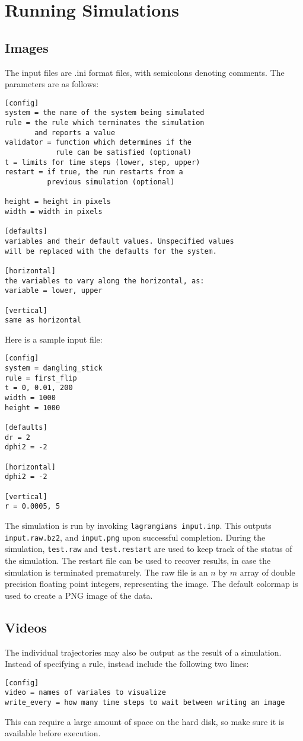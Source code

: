 \documentclass{article}
\begin{document}
\section{Running Simulations}
\subsection{Images}
The input files are .ini format files, with semicolons denoting comments. The parameters are as follows:
\begin{verbatim}
[config]
system = the name of the system being simulated
rule = the rule which terminates the simulation
       and reports a value
validator = function which determines if the
            rule can be satisfied (optional)
t = limits for time steps (lower, step, upper)
restart = if true, the run restarts from a 
          previous simulation (optional)

height = height in pixels
width = width in pixels

[defaults]
variables and their default values. Unspecified values
will be replaced with the defaults for the system.

[horizontal]
the variables to vary along the horizontal, as:
variable = lower, upper

[vertical]
same as horizontal
\end{verbatim}
Here is a sample input file:
\begin{verbatim}
[config]
system = dangling_stick
rule = first_flip
t = 0, 0.01, 200
width = 1000
height = 1000

[defaults]
dr = 2
dphi2 = -2

[horizontal]
dphi2 = -2

[vertical]
r = 0.0005, 5
\end{verbatim}

The simulation is run by invoking \texttt{lagrangians input.inp}. This outputs \texttt{input.raw.bz2}, and \texttt{input.png} upon successful completion. During the simulation, \texttt{test.raw} and \texttt{test.restart} are used to keep track of the status of the simulation. The restart file can be used to recover results, in case the simulation is terminated prematurely. The raw file is an $n$ by $m$ array of double precision floating point integers, representing the image. The default colormap is used to create a PNG image of the data.

\subsection{Videos}
The individual trajectories may also be output as the result of a simulation. Instead of specifying a rule, instead include the following two lines:
\begin{verbatim}
[config]
video = names of variales to visualize
write_every = how many time steps to wait between writing an image
\end{verbatim}
This can require a large amount of space on the hard disk, so make sure it is available before execution.
\end{document}
